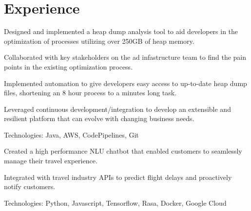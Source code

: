 \documentclass[]{deedy-resume-openfont}
\begin{document}
%
%
\lastupdated

%
%

%
%

\begin{minipage}[t]{0.64\textwidth} 


\section{Experience}
\vspace{\topsep} %
\begin{tightemize}
    \item Designed and implemented a heap dump analysis tool to aid developers in the
    optimization of processes utilizing over 250GB of heap memory.
    \item Collaborated with key stakeholders on the ad infastructure team
    to find the pain points in the existing optimization process.
    \item Implemented automation to give developers easy access to up-to-date 
    heap dump files, shortening an 8 hour process to a minutes long task.
    \item Leveraged continuous development/integration to develop an extensible
    and resilient platform that can evolve with changing business needs.
    \item Technologies: Java, AWS, CodePipelines, Git
    \end{tightemize}
\sectionsep

\begin{tightemize}
    \item Created a high performance NLU chatbot that enabled customers to seamlessly 
    manage their travel experience.
    \item Integrated with travel industry APIs to predict flight delays and proactively
    notify customers.
    \item Technologies: Python, Javascript, Tensorflow, Rasa, Docker, Google Cloud
    \end{tightemize}
\sectionsep


\end{minipage}
\end{document}
